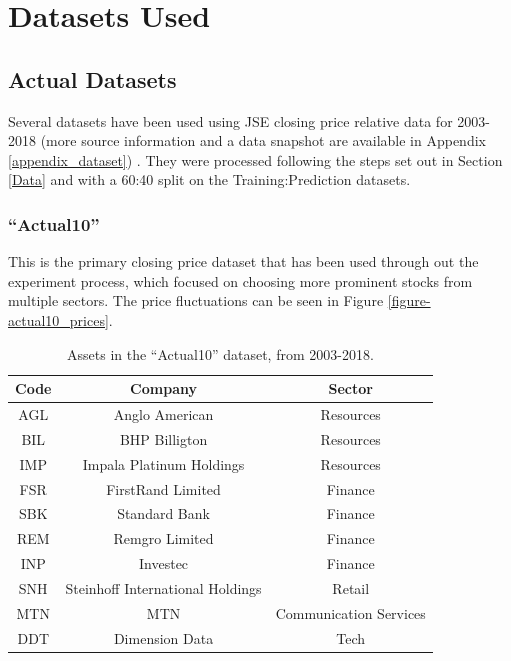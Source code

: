 \documentclass[a4paper,11pt,oneside]{article}
\theoremstyle{plain}
\theoremstyle{definition}
\begin{document}
	\newpage
	\section{Datasets Used}\label{Datasets}
	
	\subsection{Actual Datasets}
	
	Several datasets have been used using JSE closing price relative data for 2003-2018 (more source information and a data snapshot are available in Appendix \ref{appendix_dataset}) \citep{JSEData}. They were processed following the steps set out in Section \ref{Data} and with a 60:40 split on the Training:Prediction datasets.
	
	\subsubsection{``Actual10''}\label{dataset_actual10}
	
	This is the primary closing price dataset that has been used through out the experiment process, which focused on choosing more prominent stocks from multiple sectors. The price fluctuations can be seen in Figure \ref{figure-actual10_prices}.
	
	\begin{table}[H]
		\centering
		\begin{tabular}{|c|c|c|}
			\hline
			\textbf{Code} &\textbf{Company} & \textbf{Sector} \\\hline	
			{AGL} & {Anglo American} & {Resources}  \\\hline
			{BIL} & {BHP Billigton} & {Resources}  \\\hline
			{IMP} & {Impala Platinum Holdings} & {Resources}  \\\hline
			{FSR} & {FirstRand Limited} & {Finance}  \\\hline
			{SBK} & {Standard Bank} & {Finance}  \\\hline
			{REM} & {Remgro Limited} & {Finance}  \\\hline
			{INP} & {Investec} & {Finance}  \\\hline
			{SNH} & {Steinhoff International Holdings} & {Retail}    \\\hline
			{MTN} & {MTN} & {Communication Services}  \\\hline
			{DDT} & {Dimension Data} & {Tech} \\\hline
		\end{tabular}
		\newline\newline
		\caption{Assets in the ``Actual10'' dataset, from 2003-2018. }\label{tab_actual10}
	\end{table}
	
\end{document}
